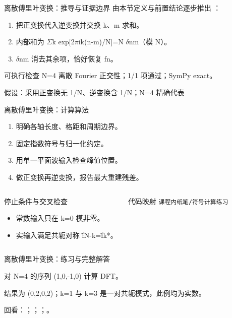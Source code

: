 \begin{frame}[t]{离散傅里叶变换：推导与证据边界}
\footnotesize
{}\quad 由本节定义与前置结论逐步推出 ：
\begin{enumerate}
\item 把正变换代入逆变换并交换 k、m 求和。
\item 内部和为 \ensuremath{\Sigma}k exp[2\ensuremath{\pi}ik(n-m)/\allowbreak{}N]=N \ensuremath{\delta}nm（模 N）。
\item \ensuremath{\delta}nm 消去其余项，恰好恢复 fn。
\end{enumerate}\begin{block}{可执行检查}
\quad N=4 离散 Fourier 正交性；1/1 项通过；SymPy exact。
\par\scriptsize 假设：采用正变换无 1/\allowbreak{}N、逆变换含 1/\allowbreak{}N；N=4 精确代表
\end{block}
\end{frame}

\begin{frame}[t]{离散傅里叶变换：计算算法}
\footnotesize
{}\begin{enumerate}
\item 明确各轴长度、格距和周期边界。
\item 固定指数符号与归一化约定。
\item 用单一平面波输入检查峰值位置。
\item 做正变换再逆变换，报告最大重建残差。
\end{enumerate}\begin{columns}[T,onlytextwidth]
\begin{block}{停止条件与交叉检查}\scriptsize\begin{itemize}
\item[\CheckMark] 常数输入只在 k=0 模非零。
\item[\CheckMark] 实输入满足共轭对称 f̃N-k=f̃k*。
\end{itemize}\end{block}
\begin{block}{代码映射}
\scriptsize \texttt{课程内纸笔/\allowbreak{}符号计算练习}
\end{block}\end{columns}\end{frame}

\begin{frame}[t]{离散傅里叶变换：练习与完整解答}
\footnotesize
\begin{block}{}对 N=4 的序列 (1,0,-1,0) 计算 DFT。\end{block}
\begin{exampleblock}{}结果为 (0,2,0,2)；k=1 与 k=3 是一对共轭模式，此例均为实数。\end{exampleblock}
\vfill
\scriptsize 回看：；；；。
\end{frame}

